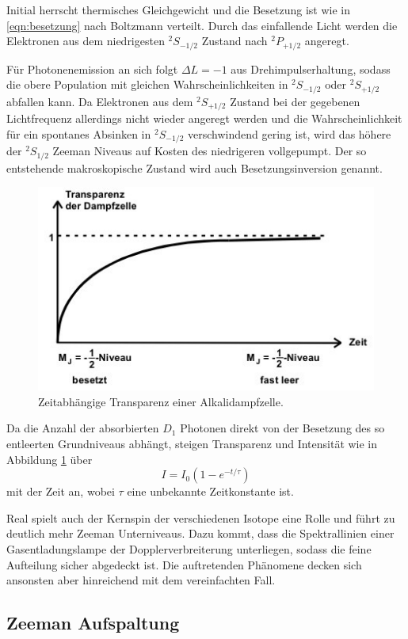 Initial herrscht thermisches Gleichgewicht und die Besetzung ist wie in \eqref{eqn:besetzung} nach Boltzmann verteilt. Durch das
einfallende Licht werden die Elektronen aus dem niedrigesten $^2S_{-1/2}$ Zustand nach $^2P_{+1/2}$ angeregt.

Für Photonenemission an sich folgt $\Delta L = -1$ aus Drehimpulserhaltung, sodass die obere Population mit gleichen
Wahrscheinlichkeiten in $^2S_{-1/2}$ oder $^2S_{+1/2}$ abfallen kann. Da Elektronen aus dem $^2S_{+1/2}$
Zustand bei der gegebenen Lichtfrequenz allerdings nicht wieder angeregt werden und die Wahrscheinlichkeit für ein spontanes
Absinken in $^2S_{-1/2}$ verschwindend gering ist, wird das höhere der $^2S_{1/2}$ Zeeman Niveaus auf Kosten des niedrigeren
vollgepumpt. Der so entstehende makroskopische Zustand wird auch Besetzungsinversion genannt.

\begin{figure}[H]
	\centering
	\includegraphics[width=0.6\linewidth]{content/grafik/transparenz.jpg}
	\caption{Zeitabhängige Transparenz einer Alkalidampfzelle. \cite{pumpen}}
	\label{fig:transparenz}
\end{figure}

Da die Anzahl der absorbierten
$D_1$ Photonen direkt von der Besetzung des so entleerten Grundniveaus abhängt, steigen Transparenz und Intensität wie
in Abbildung \ref{fig:transparenz} über
\begin{equation*}
	I = I_0 \left( 1 - e^{-t/\tau} \right)
\end{equation*}
mit der Zeit an, wobei $\tau$ eine unbekannte Zeitkonstante ist.

Real spielt auch der Kernspin der verschiedenen Isotope eine Rolle und führt zu deutlich mehr Zeeman Unterniveaus. Dazu kommt,
dass die Spektrallinien einer Gasentladungslampe der Dopplerverbreiterung unterliegen, sodass die feine Aufteilung sicher
abgedeckt ist. Die auftretenden Phänomene decken sich ansonsten aber hinreichend mit dem vereinfachten Fall.

\subsection{Zeeman Aufspaltung}


